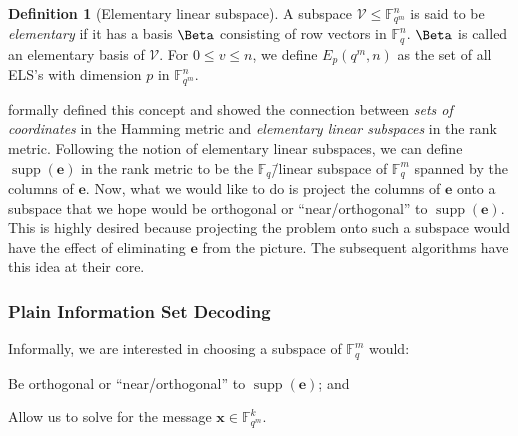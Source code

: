 \documentclass[version=last, paper=A4, parskip=half, oneside]{scrbook}
\theoremstyle{plain}
\theoremstyle{definition}
\newtheorem{definition}{Definition}
\theoremstyle{remark}
\renewcommand*{\vec}{\symbf}
\DeclareMathOperator{\supp}{supp}
\newcommand*{\FF}{\ensuremath{\mathbb{F}}}
\begin{document}
\begin{definition}[Elementary linear subspace]
  A subspace \(\mathcal{V} \le \FF_{q^m}^n\) is said to be \emph{elementary} if
  it has a basis \(\Beta\) consisting of row vectors in \(\FF_q^n\).  \(\Beta\)
  is called an elementary basis of \(\mathcal{V}\).  For \(0 \le v \le n\), we
  define \(E_p(q^m, n)\) as the set of all ELS's with dimension \(p\) in
  \(\FF_{q^m}^n\).
\end{definition}

\Textcite{GY08} formally defined this concept and showed the connection between
\emph{sets of coordinates} in the Hamming metric and \emph{elementary linear
  subspaces} in the rank metric.  Following the notion of elementary linear
subspaces, we can define \(\supp(\vec{e})\) in the rank metric to be the
\(\FF_q\)\=/linear subspace of \(\FF_q^m\) spanned by the columns of
\(\vec{e}\).  Now, what we would like to do is project the columns of
\(\vec{e}\) onto a subspace that we hope would be orthogonal or
\enquote{near\-/orthogonal} to \(\supp(\vec{e})\).  This is highly desired
because projecting the problem onto such a subspace would have the effect of
eliminating \(\vec{e}\) from the picture.  The subsequent algorithms have this
idea at their core.

\subsubsection{Plain Information Set Decoding}

Informally, we are interested in choosing a subspace of \(\FF_q^m\) would:
\begin{conditions}
\item\label{cond:orthogonality} Be orthogonal or \enquote{near\-/orthogonal} to
  \(\supp(\vec{e})\); and
\item\label{cond:determinedness} Allow us to solve for the message
  \(\vec{x} \in \FF_{q^m}^k\).
\end{conditions}
\end{document}

